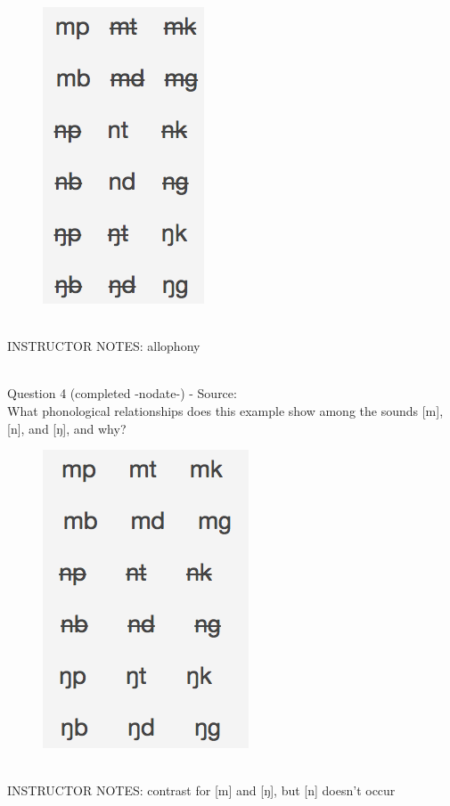 \documentclass[12pt]{article}
\begin{document}
\begin{figure}[H]
\includegraphics{../images/quiz4question5_b.png}
\end{figure}

~\\
INSTRUCTOR NOTES: allophony


~\\

{\large Question 4} (completed -nodate-) - Source: \\

What phonological relationships does this example show among the sounds [m], [n], and [ŋ], and why?\\

\begin{figure}[H]
\includegraphics{../images/quiz4question5_c.png}
\end{figure}

~\\
INSTRUCTOR NOTES: contrast for [m] and [ŋ], but [n] doesn't occur
\end{document}

